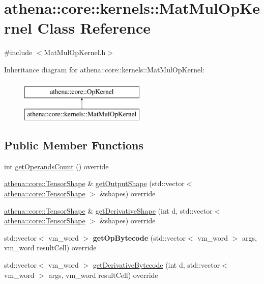 \hypertarget{classathena_1_1core_1_1kernels_1_1_mat_mul_op_kernel}{}\section{athena\+:\+:core\+:\+:kernels\+:\+:Mat\+Mul\+Op\+Kernel Class Reference}
\label{classathena_1_1core_1_1kernels_1_1_mat_mul_op_kernel}


{\ttfamily \#include $<$Mat\+Mul\+Op\+Kernel.\+h$>$}

Inheritance diagram for athena\+:\+:core\+:\+:kernels\+:\+:Mat\+Mul\+Op\+Kernel\+:\begin{figure}[H]
\begin{center}
\leavevmode
\includegraphics[height=2.000000cm]{classathena_1_1core_1_1kernels_1_1_mat_mul_op_kernel}
\end{center}
\end{figure}
\subsection*{Public Member Functions}
\begin{DoxyCompactItemize}
\item 
int \mbox{\hyperlink{classathena_1_1core_1_1kernels_1_1_mat_mul_op_kernel_a75f9e43d1fcecaf9260af31c68cd69db}{get\+Operands\+Count}} () override
\item 
\mbox{\hyperlink{classathena_1_1core_1_1_tensor_shape}{athena\+::core\+::\+Tensor\+Shape}} \& \mbox{\hyperlink{classathena_1_1core_1_1kernels_1_1_mat_mul_op_kernel_a3a397257c208f55ba5fba4018112a605}{get\+Output\+Shape}} (std\+::vector$<$ \mbox{\hyperlink{classathena_1_1core_1_1_tensor_shape}{athena\+::core\+::\+Tensor\+Shape}} $>$ \&shapes) override
\item 
\mbox{\hyperlink{classathena_1_1core_1_1_tensor_shape}{athena\+::core\+::\+Tensor\+Shape}} \& \mbox{\hyperlink{classathena_1_1core_1_1kernels_1_1_mat_mul_op_kernel_abdb57e6ce0d67ce6263e0716fed25243}{get\+Derivative\+Shape}} (int d, std\+::vector$<$ \mbox{\hyperlink{classathena_1_1core_1_1_tensor_shape}{athena\+::core\+::\+Tensor\+Shape}} $>$ \&shapes) override
\item 
\mbox{\label{classathena_1_1core_1_1kernels_1_1_mat_mul_op_kernel_ac6dc778bb5313e5c567410fd5f217351}} 
std\+::vector$<$ vm\+\_\+word $>$ {\bfseries get\+Op\+Bytecode} (std\+::vector$<$ vm\+\_\+word $>$ args, vm\+\_\+word result\+Cell) override
\item 
std\+::vector$<$ vm\+\_\+word $>$ \mbox{\hyperlink{classathena_1_1core_1_1kernels_1_1_mat_mul_op_kernel_a42d08b8004e8033e01988eb2392215c8}{get\+Derivative\+Bytecode}} (int d, std\+::vector$<$ vm\+\_\+word $>$ args, vm\+\_\+word result\+Cell) override
\end{DoxyCompactItemize}
